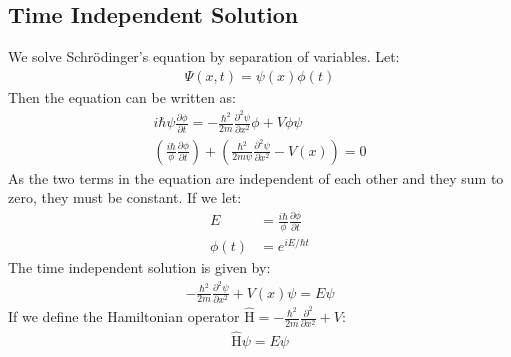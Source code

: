 \documentclass[11pt]{article}
\newcommand{\pd}[2]{
  \ensuremath{
    \frac{\partial #1}{\partial #2} }} %
\newcommand{\operator}[1]{
  \ensuremath{\hat{\text{#1}}}}        %
\begin{document}
\begin{multicols*}{3}
\subsection{Time Independent Solution}
We solve Schr\"{o}dinger's equation by separation of variables. Let:
\begin{align*}
\Psi(x, t) = \psi(x) \phi(t)
\end{align*}
Then the equation can be written as:
\begin{align*}
i\hbar \psi \pd{\phi}{t} = -\frac{\hbar^2}{2m} \pd{^2 \psi}{x^2} \phi + V \phi \psi \\
\left( \frac{i\hbar}{\phi} \pd{\phi}{t} \right) + \left( \frac{\hbar^2}{2m\psi} \pd{^2 \psi}{x^2} -V(x) \right) = 0
\end{align*}
As the two terms in the equation are independent of each other and they sum to zero, they must be constant. If we let:
\begin{align*}
E &= \frac{i\hbar}{\phi} \pd{\phi}{t} \\
\phi(t) &= e^{iE/ \hbar t}
\end{align*}
The time independent solution is given by:
\begin{align*}
-\frac{\hbar^2}{2m}\pd{^2\psi}{x^2} + V(x) \psi = E \psi
\end{align*}
If we define the Hamiltonian operator $\operator{H} = -\frac{\hbar^2}{2m}\pd{^2}{x^2} + V$:
\begin{align*}
\operator{H} \psi = E\psi
\end{align*}
\end{multicols*}
\end{document}
